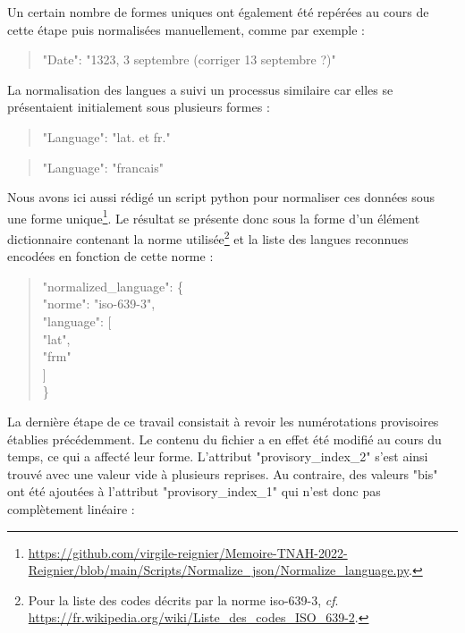 \documentclass[a4paper,12pt,twoside]{book}
\begin{document}
	\noindent Un certain nombre de formes uniques ont également été repérées au cours de cette étape puis normalisées manuellement, comme par exemple :
	
	\begin{quotation}
		"Date": "1323, 3 septembre (corriger 13 septembre ?)"
	\end{quotation}

	\noindent La normalisation des langues a suivi un processus similaire car elles se présentaient initialement sous plusieurs formes :
	
	\begin{quotation}
		"Language": "lat. et fr."
	\end{quotation}

	\begin{quotation}
		"Language": "francais"
	\end{quotation}
	
	\pagebreak
	
	\noindent Nous avons ici aussi rédigé un script python pour normaliser ces données sous une forme unique\footnote{\url{https://github.com/virgile-reignier/Memoire-TNAH-2022-Reignier/blob/main/Scripts/Normalize_json/Normalize_language.py}.}. Le résultat se présente donc sous la forme d'un élément dictionnaire contenant la norme utilisée\footnote{Pour la liste des codes décrits par la norme iso-639-3, \textit{cf}. \url{https://fr.wikipedia.org/wiki/Liste_des_codes_ISO_639-2}.} et la liste des langues reconnues encodées en fonction de cette norme :
	
	\begin{quotation}
				"normalized\_language": \{\\
			\indent\indent "norme": "iso-639-3",\\
			\indent\indent "language": [\\
			\indent\indent\indent "lat",\\
			\indent\indent\indent "frm"\\
			\indent\indent]\\
			\indent\}
	\end{quotation}
	
	\noindent La dernière étape de ce travail consistait à revoir les numérotations provisoires établies précédemment. Le contenu du fichier a en effet été modifié au cours du temps, ce qui a affecté leur forme. L'attribut "provisory\_index\_2" s'est ainsi trouvé avec une valeur vide à plusieurs reprises. Au contraire, des valeurs "bis" ont été ajoutées à l'attribut "provisory\_index\_1" qui n'est donc pas complètement linéaire :
	
\end{document}

